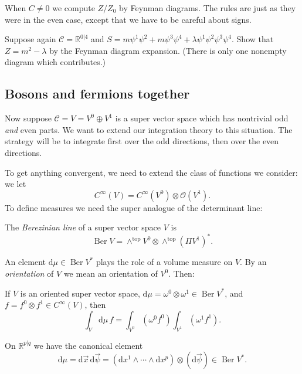\documentclass[12pt,letterpaper,reqno]{article}
\numberwithin{equation}{section}
\newcommand{\cC}{\ensuremath{\mathcal C}}
\newcommand{\cO}{\ensuremath{\mathcal O}}
\newcommand{\R}{\ensuremath{\mathbb R}}
\newcommand{\de}{\mathrm{d}}
\newcommand{\rmtop}{\mathrm{top}}
\newcommand{\ti}[1]{\textit{#1}}
\DeclareMathOperator{\Ber}{Ber}
\newcommand{\fixme}[1]{{\color{orange}{[#1]}}}
\begin{document}
When $C \neq 0$ we compute $Z / Z_0$ by Feynman diagrams.
The rules are just as they were in the even case, except that
we have to be careful about signs.
\fixme{...}

\begin{exercise} Suppose again $\cC = \R^{0 \vert 4}$ and $S = m \psi^1 \psi^2 + m \psi^3 \psi^4 + \lambda \psi^1 \psi^2 \psi^3 \psi^4$. Show that $Z = m^2 - \lambda$ by the Feynman diagram expansion. (There is only
one nonempty diagram which contributes.)
\end{exercise}


\subsection{Bosons and fermions together}

Now suppose $\cC = V = V^0 \oplus V^1$ is a super vector space 
which has nontrivial odd \ti{and} even parts. We want to extend
our integration theory to this situation. The strategy will be to 
integrate first over the odd directions, then over 
the even directions.

To get anything convergent,
we need to extend the class of functions we consider:
we let
\begin{equation}
  C^\infty(V) = C^\infty(V^0) \otimes \cO(V^1).
\end{equation}
To define measures we need 
the super analogue of the determinant line:
\begin{defn}
The \ti{Berezinian line} of a super vector space $V$ is
\begin{equation}
  \Ber V = \wedge^\rmtop V^0 \otimes \wedge^\rmtop (\Pi V^1)^*.
\end{equation}
\end{defn}
An element $\de \mu \in \Ber V^*$ plays the role of a volume measure
on $V$. By an \ti{orientation} of $V$ we mean an orientation of $V^0$.
Then:
\begin{defn} If $V$ is an oriented 
super vector space, $\de \mu = \omega^0 \otimes \omega^1 \in \Ber V^*$,
and $f = f^0 \otimes f^1 \in C^\infty(V)$, then
\begin{equation}
    \int_V \de \mu \, f = \int_{V^0} \left( \omega^0 f^0 \right) \int_{V^1} \left( \omega^1 f^1 \right).
\end{equation}
\end{defn}
On $\R^{p \vert q}$ we have the canonical element
\begin{equation}
  \de \mu = \de \vec{x} \, \de \vec{\psi} = (\de x^1 \wedge \cdots \wedge \de x^p) \otimes (\de \vec\psi) \in \Ber V^*.
\end{equation}
\end{document}
